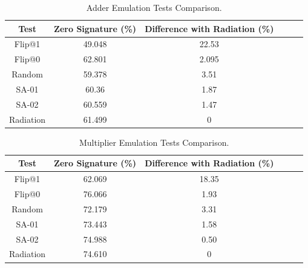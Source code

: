 \begin{table}[tb!]
\center
\caption{Adder Emulation Tests Comparison.}

\label{AE}

\begin{tabular}{|c | c| c | c| c| c |} 
 \hline
Test & Zero Signature (\%) & Difference with Radiation (\%)   \\ 
\hline

 
 
 Flip@1& 49.048 &22.53   \\
 \hline
 Flip@0 & 62.801 & 2.095 \\ 
 \hline
 
 Random & 59.378 & 3.51  \\
 \hline
 SA-01 & 60.36 & 1.87 \\
 \hline
 SA-02 & 60.559 &1.47  \\
 \hline
 Radiation & 61.499 & 0  \\
 \hline
 
 
\end{tabular}
\end{table}


\begin{table}[tb!]
\center
\caption{Multiplier Emulation Tests Comparison.}

\label{ME}

\begin{tabular}{|c | c| c | c| c| c |} 
 \hline
Test & Zero Signature (\%) & Difference with Radiation (\%)   \\ 
\hline

 
 
 Flip@1& 62.069 &18.35   \\
 \hline
 Flip@0 & 76.066 & 1.93 \\ 
 \hline
 
 Random & 72.179 & 3.31  \\
 \hline
 SA-01 & 73.443 & 1.58 \\
 \hline
 SA-02 & 74.988 &  0.50\\
 \hline
 Radiation & 74.610 & 0  \\
 \hline
 
 
\end{tabular}
\end{table}







